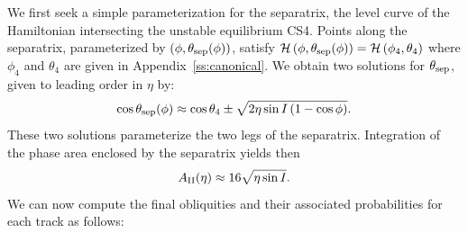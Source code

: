 We first seek a simple parameterization for the separatrix, the level curve of
the Hamiltonian intersecting the unstable equilibrium CS4. Points along the
separatrix, parameterized by $\left(\phi, \theta_{\rm sep}(\phi)\right)$, satisfy
$\mathcal{H}\left(\phi, \theta_{\rm sep}(\phi)\right) = \mathcal{H}\left(\phi_4, \theta_4\right)$
where $\phi_4$ and $\theta_4$ are given in Appendix~\ref{ss:canonical}. We
obtain two solutions for $\theta_{\rm sep}$, given to leading order in $\eta$
by:
\begin{equation}
    \cos \theta_{\rm sep}(\phi) \approx \cos \theta_4 \pm
        \sqrt{2\eta \sin I\p{1 - \cos \phi}}.
\end{equation}
These two solutions parameterize the two legs of the separatrix. Integration of
the phase area enclosed by the separatrix yields then
\begin{equation}
    A_{\rm II}(\eta) \approx 16\sqrt{\eta \sin I}.\label{eq:a_approx}
\end{equation}
We can now compute the final obliquities and their associated probabilities for
each track as follows:
